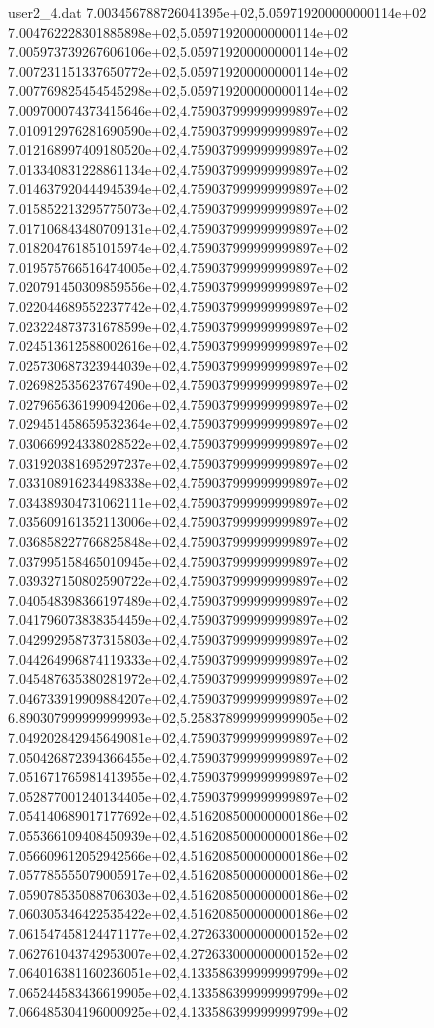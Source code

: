 \begin{filecontents}{user2_4.dat}
7.003456788726041395e+02,5.059719200000000114e+02
7.004762228301885898e+02,5.059719200000000114e+02
7.005973739267606106e+02,5.059719200000000114e+02
7.007231151337650772e+02,5.059719200000000114e+02
7.007769825454545298e+02,5.059719200000000114e+02
7.009700074373415646e+02,4.759037999999999897e+02
7.010912976281690590e+02,4.759037999999999897e+02
7.012168997409180520e+02,4.759037999999999897e+02
7.013340831228861134e+02,4.759037999999999897e+02
7.014637920444945394e+02,4.759037999999999897e+02
7.015852213295775073e+02,4.759037999999999897e+02
7.017106843480709131e+02,4.759037999999999897e+02
7.018204761851015974e+02,4.759037999999999897e+02
7.019575766516474005e+02,4.759037999999999897e+02
7.020791450309859556e+02,4.759037999999999897e+02
7.022044689552237742e+02,4.759037999999999897e+02
7.023224873731678599e+02,4.759037999999999897e+02
7.024513612588002616e+02,4.759037999999999897e+02
7.025730687323944039e+02,4.759037999999999897e+02
7.026982535623767490e+02,4.759037999999999897e+02
7.027965636199094206e+02,4.759037999999999897e+02
7.029451458659532364e+02,4.759037999999999897e+02
7.030669924338028522e+02,4.759037999999999897e+02
7.031920381695297237e+02,4.759037999999999897e+02
7.033108916234498338e+02,4.759037999999999897e+02
7.034389304731062111e+02,4.759037999999999897e+02
7.035609161352113006e+02,4.759037999999999897e+02
7.036858227766825848e+02,4.759037999999999897e+02
7.037995158465010945e+02,4.759037999999999897e+02
7.039327150802590722e+02,4.759037999999999897e+02
7.040548398366197489e+02,4.759037999999999897e+02
7.041796073838354459e+02,4.759037999999999897e+02
7.042992958737315803e+02,4.759037999999999897e+02
7.044264996874119333e+02,4.759037999999999897e+02
7.045487635380281972e+02,4.759037999999999897e+02
7.046733919909884207e+02,4.759037999999999897e+02
6.890307999999999993e+02,5.258378999999999905e+02
7.049202842945649081e+02,4.759037999999999897e+02
7.050426872394366455e+02,4.759037999999999897e+02
7.051671765981413955e+02,4.759037999999999897e+02
7.052877001240134405e+02,4.759037999999999897e+02
7.054140689017177692e+02,4.516208500000000186e+02
7.055366109408450939e+02,4.516208500000000186e+02
7.056609612052942566e+02,4.516208500000000186e+02
7.057785555079005917e+02,4.516208500000000186e+02
7.059078535088706303e+02,4.516208500000000186e+02
7.060305346422535422e+02,4.516208500000000186e+02
7.061547458124471177e+02,4.272633000000000152e+02
7.062761043742953007e+02,4.272633000000000152e+02
7.064016381160236051e+02,4.133586399999999799e+02
7.065244583436619905e+02,4.133586399999999799e+02
7.066485304196000925e+02,4.133586399999999799e+02

\end{filecontents}
